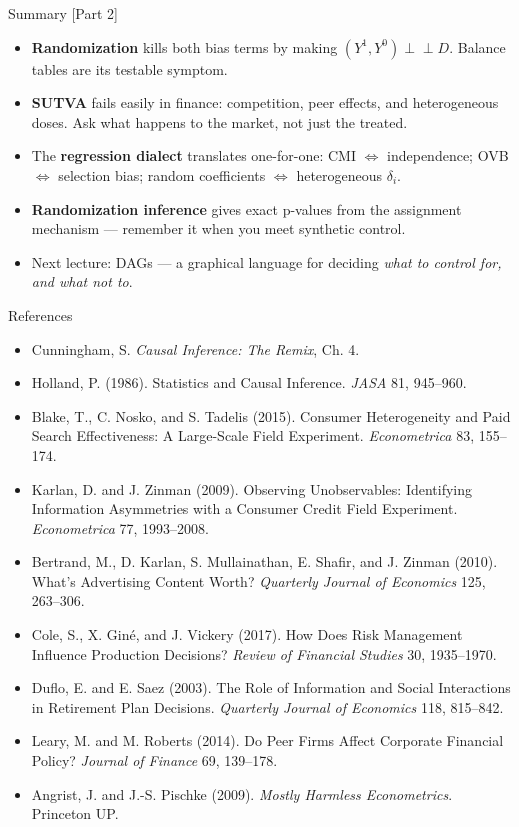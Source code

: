 \documentclass[
  11pt,
  ignorenonframetext,
  aspectratio=169,
]{beamer}
\providecommand{\tightlist}{%
  \setlength{\itemsep}{0pt}\setlength{\parskip}{0pt}}
\newcommand{\indep}{\perp\!\!\!\perp}
\begin{document}
\begin{frame}{Summary {[}Part 2{]}}
\protect{}\label{summary-part-2}
\begin{itemize}
\tightlist
\item
  \textbf{Randomization} kills both bias terms by making
  \((Y^1, Y^0) \indep D\). Balance tables are its testable symptom.
\item
  \textbf{SUTVA} fails easily in finance: competition, peer effects, and
  heterogeneous doses. Ask what happens to the market, not just the
  treated.
\item
  The \textbf{regression dialect} translates one-for-one: CMI
  \(\Leftrightarrow\) independence; OVB \(\Leftrightarrow\) selection
  bias; random coefficients \(\Leftrightarrow\) heterogeneous
  \(\delta_i\).
\item
  \textbf{Randomization inference} gives exact p-values from the
  assignment mechanism --- remember it when you meet synthetic control.
\item
  Next lecture: DAGs --- a graphical language for deciding \emph{what to
  control for, and what not to}.
\end{itemize}
\end{frame}

\begin{frame}{References}
\protect{}\label{references}
\footnotesize

\begin{itemize}
\tightlist
\item
  Cunningham, S. \emph{Causal Inference: The Remix}, Ch. 4.
\item
  Holland, P. (1986). Statistics and Causal Inference. \emph{JASA} 81,
  945--960.
\item
  Blake, T., C. Nosko, and S. Tadelis (2015). Consumer Heterogeneity and
  Paid Search Effectiveness: A Large-Scale Field Experiment.
  \emph{Econometrica} 83, 155--174.
\item
  Karlan, D. and J. Zinman (2009). Observing Unobservables: Identifying
  Information Asymmetries with a Consumer Credit Field Experiment.
  \emph{Econometrica} 77, 1993--2008.
\item
  Bertrand, M., D. Karlan, S. Mullainathan, E. Shafir, and J. Zinman
  (2010). What's Advertising Content Worth? \emph{Quarterly Journal of
  Economics} 125, 263--306.
\item
  Cole, S., X. Giné, and J. Vickery (2017). How Does Risk Management
  Influence Production Decisions? \emph{Review of Financial Studies} 30,
  1935--1970.
\item
  Duflo, E. and E. Saez (2003). The Role of Information and Social
  Interactions in Retirement Plan Decisions. \emph{Quarterly Journal of
  Economics} 118, 815--842.
\item
  Leary, M. and M. Roberts (2014). Do Peer Firms Affect Corporate
  Financial Policy? \emph{Journal of Finance} 69, 139--178.
\item
  Angrist, J. and J.-S. Pischke (2009). \emph{Mostly Harmless
  Econometrics}. Princeton UP.
\end{itemize}
\end{frame}
\end{document}
